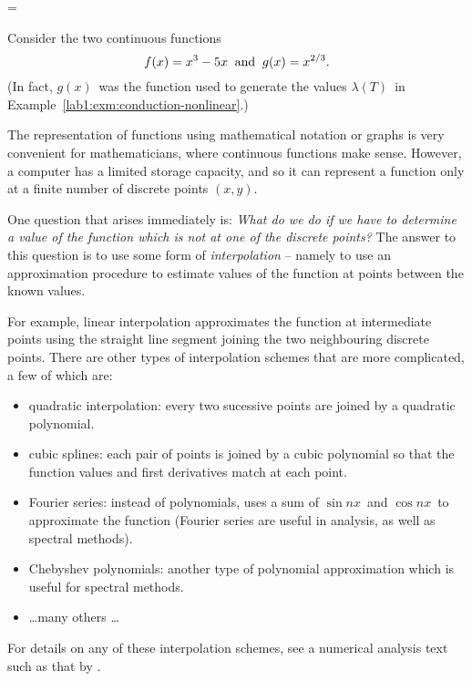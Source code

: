 \documentclass{article}
\makeatletter
\let\realnormalsize=\normalsize
\def\liih@math{\ifmmode$\else\bad@math\fi}
\def\adjustnormalsize{\def\normalsize{\mathsurround=0pt \realnormalsize
 \parindent=0pt\abovedisplayskip=0pt\belowdisplayskip=0pt}%
 \def\phantompar{\csname par\endcsname}\normalsize}%
\newcommand\lthtmlvboxmathA{\adjustnormalsize\setbox\sizebox=\vbox\bgroup %
 \let\ifinner=\iffalse \let\)\liih@math }%
\newcommand\lthtmlmathtype[1]{\gdef\lthtmlmathenv{#1}}%
\newcommand\lthtmlfigureA[1]{\let\@savefreelist\@freelist
       \lthtmlmathtype{#1}\lthtmlvboxmathA}%
\makeatother
\begin{document}
{\newpage\clearpage
\lthtmlfigureA{example531}%
\begin{example}

  Consider the two continuous functions 
  \begin{displaymath}
    f(x)=x^3-5x \;\; {\rm and} \;\; g(x)=x^{2/3} . 
  \end{displaymath}
  (In fact, $g(x)$\  was the function used to generate the values
  $\lambda(T)$\  in Example~\ref{lab1:exm:conduction-nonlinear}.)
\par The representation of functions using mathematical notation or
  graphs is very convenient for mathematicians, where continuous
  functions make sense.  However, a computer has a limited storage
  capacity, and so it can represent a function only at a finite number
  of discrete points $(x,y)$.
\par One question that arises immediately is: \emph{What do we do if we
    have to determine a value of the function which is not at one of
    the discrete points?}  
  The answer to this question is to use some form of {\em     interpolation} -- namely 
  to use an approximation procedure to estimate values of the function
  at points between the known values.
\par For example, linear interpolation approximates the function at
  intermediate points using the straight line segment joining the two
  neighbouring discrete points.
  There are other types of interpolation schemes that are more
  complicated, a few of which are:
  \begin{itemize}
  \item quadratic interpolation: every two sucessive points are joined
    by a quadratic polynomial.
  \item cubic splines: each pair of points is joined by a cubic
    polynomial so that the function values and first derivatives match
    at each point.
  \item Fourier series: instead of polynomials, uses a sum of 
    $\sin nx$\  and $\cos nx$\  to approximate the function (Fourier
    series are useful in analysis, as well as spectral methods).
  \item Chebyshev polynomials: another type of polynomial
    approximation which is useful for spectral methods.
  \item \dots many others \dots 
  \end{itemize}
  For details on any of these interpolation schemes, see a numerical
  analysis text such as that by \cite{burden-faires}.   

\end{example}}
\end{document}
